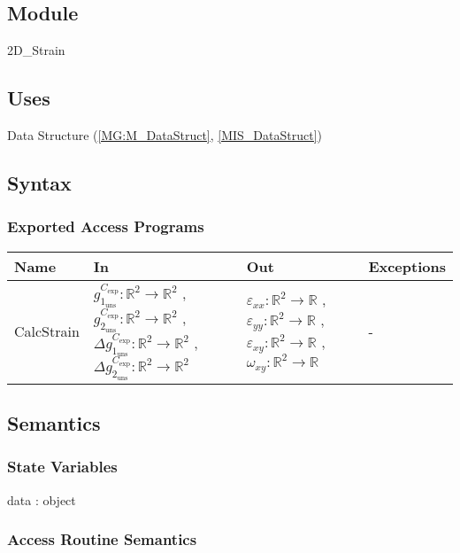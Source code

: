 \documentclass[12pt, titlepage]{article}
\begin{document}
\subsection{Module}
2D{\_}Strain
\subsection{Uses}
Data Structure (\cref{MG:M_DataStruct}, \cref{MIS_DataStruct})
\subsection{Syntax}

\subsubsection{Exported Access Programs}

\begin{center}
\begin{tabular}{p{2cm} p{4cm} p{4cm} p{2cm}}
\hline
\textbf{Name} & \textbf{In} & \textbf{Out} & \textbf{Exceptions} \\
\hline
CalcStrain & $g_{1_{{\text{uns}}}}^{C_{\text{exp}}}:\mathbb{R}^2\rightarrow\mathbb{R}^2$ , $g_{2_{{\text{uns}}}}^{C_{\text{exp}}}:\mathbb{R}^2\rightarrow\mathbb{R}^2$ , $\Delta g_{1_{{\text{uns}}}}^{C_{\text{exp}}}:\mathbb{R}^2\rightarrow\mathbb{R}^2$ , $\Delta g_{2_{{\text{uns}}}}^{C_{\text{exp}}}:\mathbb{R}^2\rightarrow\mathbb{R}^2$  & $\varepsilon_{\mathit{xx}}:\mathbb{R}^2\rightarrow\mathbb{R}$ , $\varepsilon_{\mathit{yy}}:\mathbb{R}^2\rightarrow\mathbb{R}$ , $\varepsilon_{\mathit{xy}}:\mathbb{R}^2\rightarrow\mathbb{R}$ , $\omega_{\mathit{xy}}:\mathbb{R}^2\rightarrow\mathbb{R}$ & - \\
\hline
\end{tabular}
\end{center}

\subsection{Semantics}

\subsubsection{State Variables}
data : object

\subsubsection{Access Routine Semantics}
\end{document}
